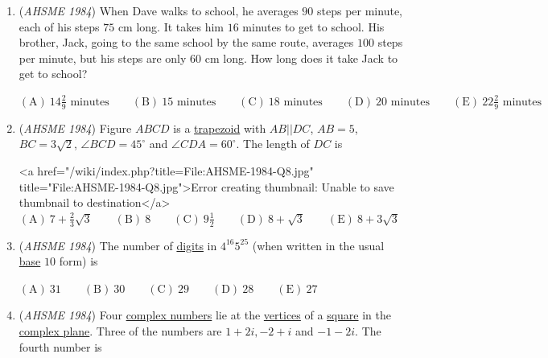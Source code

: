 \begin{enumerate}
 $\mathrm{(A) \ }31b \qquad \mathrm{(B) \ }\frac{37}{27}b \qquad \mathrm{(C) \ } 13g \qquad \mathrm{(D) \ }\frac{37}{27}g \qquad \mathrm{(E) \ } \frac{37}{27}t$


	\item (\textit{AHSME 1984}) When Dave walks to school, he averages $90$ steps per minute, each of his steps $75$ cm long. It takes him $16$ minutes to get to school. His brother, Jack, going to the same school by the same route, averages $100$ steps per minute, but his steps are only $60$ cm long. How long does it take Jack to get to school?


 $\mathrm{(A) \ }14 \frac{2}{9} \text{ minutes} \qquad \mathrm{(B) \ }15 \text{ minutes}\qquad \mathrm{(C) \ } 18 \text{ minutes}\qquad \mathrm{(D) \ }20 \text{ minutes} \qquad \mathrm{(E) \ } 22 \frac{2}{9} \text{ minutes}$


	\item (\textit{AHSME 1984}) Figure $ABCD$ is a \href{https://artofproblemsolving.com/wiki/index.php?title=Trapezoid}{trapezoid} with $AB||DC$, $AB=5$, $BC=3\sqrt{2}$, $\angle BCD=45^\circ$ and $\angle CDA=60^\circ$. The length of $DC$ is


 <a href="/wiki/index.php?title=File:AHSME-1984-Q8.jpg" title="File:AHSME-1984-Q8.jpg">Error creating thumbnail: Unable to save thumbnail to destination</a>
$\mathrm{(A) \ }7+\frac{2}{3}\sqrt{3} \qquad \mathrm{(B) \ }8 \qquad \mathrm{(C) \ } 9 \frac{1}{2} \qquad \mathrm{(D) \ }8+\sqrt{3} \qquad \mathrm{(E) \ } 8+3\sqrt{3}$


	\item (\textit{AHSME 1984}) The number of \href{https://artofproblemsolving.com/wiki/index.php?title=Digit}{digits} in $4^{16}5^{25}$ (when written in the usual \href{https://artofproblemsolving.com/wiki/index.php?title=Base\_number}{base} $10$ form) is


 $\mathrm{(A) \ }31 \qquad \mathrm{(B) \ }30 \qquad \mathrm{(C) \ } 29 \qquad \mathrm{(D) \ }28 \qquad \mathrm{(E) \ } 27$


	\item (\textit{AHSME 1984}) Four \href{https://artofproblemsolving.com/wiki/index.php?title=Complex\_numbers}{complex numbers} lie at the \href{https://artofproblemsolving.com/wiki/index.php?title=Vertices}{vertices} of a \href{https://artofproblemsolving.com/wiki/index.php?title=Square}{square} in the \href{https://artofproblemsolving.com/wiki/index.php?title=Complex\_plane}{complex plane}. Three of the numbers are $1+2i, {-2}+i$ and ${-1}-2i$. The fourth number is 



\end{enumerate}
